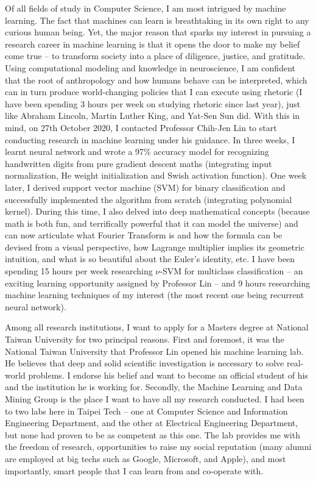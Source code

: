 \documentclass[letterpaper,12pt]{article}
\begin{document}
Of all fields of study in Computer Science, I am most intrigued by machine learning. The fact that machines can learn is breathtaking in its own right to any curious human being. Yet, the major reason that sparks my interest in pursuing a research career in machine learning is that it opens the door to make my belief come true -- to transform society into a place of diligence, justice, and gratitude. Using computational modeling and knowledge in neuroscience, I am confident that the root of anthropology and how humans behave can be interpreted, which can in turn produce world-changing policies that I can execute using rhetoric (I have been spending 3 hours per week on studying rhetoric since last year), just like Abraham Lincoln, Martin Luther King, and Yat-Sen Sun did. With this in mind, on 27th October 2020, I contacted Professor Chih-Jen Lin to start conducting research in machine learning under his guidance. In three weeks, I learnt neural network and wrote a 97\% accuracy model for recognizing handwritten digits from pure gradient descent maths (integrating input normalization, He weight initialization and Swish activation function). One week later, I derived support vector machine (SVM) for binary classification and successfully implemented the algorithm from scratch (integrating polynomial kernel). During this time, I also delved into deep mathematical concepts (because math is both fun, and terrifically powerful that it can model the universe) and can now articulate what Fourier Transform is and how the formula can be devised from a visual perspective, how Lagrange multiplier implies its geometric intuition, and what is so beautiful about the Euler's identity, etc. I have been spending 15 hours per week researching \(\nu\)-SVM for multiclass classification -- an exciting learning opportunity assigned by Professor Lin -- and 9 hours researching machine learning techniques of my interest (the most recent one being recurrent neural network).

Among all research institutions, I want to apply for a Masters degree at National Taiwan University for two principal reasons. First and foremost, it was the National Taiwan University that Professor Lin opened his machine learning lab. He believes that deep and solid scientific investigation is necessary to solve real-world problems. I endorse his belief and want to become an official student of his and the institution he is working for. Secondly, the Machine Learning and Data Mining Group is the place I want to have all my research conducted. I had been to two labs here in Taipei Tech -- one at Computer Science and Information Engineering Department, and the other at Electrical Engineering Department, but none had proven to be as competent as this one. The lab provides me with the freedom of research, opportunities to raise my social reputation (many alumni are employed at big techs such as Google, Microsoft, and Apple), and most importantly, smart people that I can learn from and co-operate with.
\end{document}

